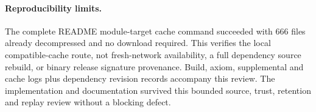 \documentclass{article}
\begin{document}
\paragraph{Reproducibility limits.} The complete README module-target cache command succeeded with 666 files already decompressed and no download required. This verifies the local compatible-cache route, not fresh-network availability, a full dependency source rebuild, or binary release signature provenance. Build, axiom, supplemental and cache logs plus dependency revision records accompany this review. The implementation and documentation survived this bounded source, trust, retention and replay review without a blocking defect.
\end{document}
